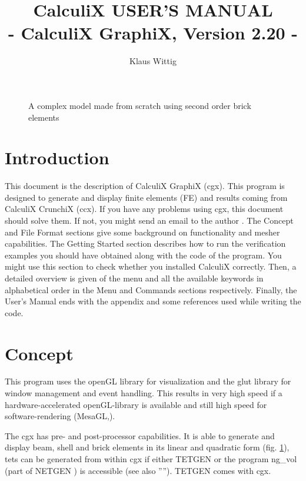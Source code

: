 \documentclass{article}
\begin{document}
\title{CalculiX USER'S MANUAL\\ - CalculiX GraphiX, Version 2.20 -}
\author{Klaus Wittig}
\maketitle
\begin{figure}[h]
\caption{\label{cover} A complex model made from scratch using second order brick elements }
\end{figure}
\newpage


\tableofcontents


\section{Introduction}
 This document is the description of CalculiX GraphiX (cgx). This program is designed to generate and display finite elements (FE) and results coming from CalculiX CrunchiX (ccx). If you have any problems using cgx, this document should solve them. If not, you might send an email to the author \cite{cgx}. The Concept and File Format sections give some background on functionality and mesher capabilities. The Getting Started section describes how to run the verification examples you should have obtained along with the code of the program. You might use this section to check whether you installed CalculiX correctly. Then, a detailed overview is given of the menu and all the available keywords in alphabetical order in the Menu and Commands sections respectively. Finally, the User's Manual ends with the appendix and some references used while writing the code.


\section{Concept}
This program uses the openGL library for visualization and the glut library \cite{glut} for window management and event handling. This results in very high speed if a hardware-accelerated openGL-library is available and still high speed for software-rendering (MesaGL,\cite{mesa}). 

The cgx has pre- and post-processor capabilities. It is able to generate and display beam, shell and brick elements in its linear and quadratic form (fig. \ref{cover}), tets can be generated from within cgx if either TETGEN \cite{TETGEN} or the program ng\_vol (part of NETGEN \cite{NETGEN}) is accessible (see also ''''). TETGEN comes with cgx.
\end{document}
